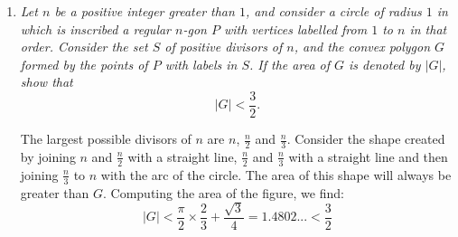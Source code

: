 \documentclass{article}
\begin{document}
\begin{enumerate}
\medskip
\item %
{\itshape Let $n$ be a positive integer greater than $1$, and consider a circle of radius $1$ in which is inscribed a regular $n$-gon $P$ with vertices labelled from $1$ to $n$ in that order.
Consider the set $S$ of positive divisors of $n$, and the convex polygon $G$ formed by the points of $P$ with labels in $S$.
If the area of $G$ is denoted by $|G|$, show that
\[ 
	|G| < \frac{3}{2}.
\]}

The largest possible divisors of $n$ are $n$, $\frac{n}{2}$ and $\frac{n}{3}$. Consider the shape created by joining $n$ and $\frac{n}{2}$ with a straight line, $\frac{n}{2}$ and $\frac{n}{3}$ with a straight line and then joining $\frac{n}{3}$ to $n$ with the arc of the circle. The area of this shape will always be greater than $G$. Computing the area of the figure, we find:
$$|G| < \frac{\pi}{2} \times \frac{2}{3} + \frac{\sqrt{3}}{4} = 1.4802... < \frac{3}{2}$$


\end{enumerate}
\end{document}

